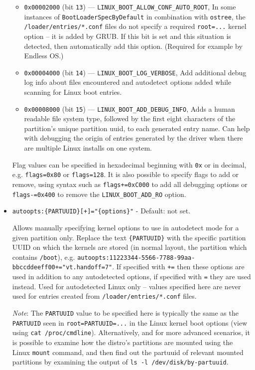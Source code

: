 \documentclass[]{article}
\begin{document}
\begin{itemize}
\begin{itemize}
	  \item \texttt{0x00002000} (bit \texttt{13}) --- \texttt{LINUX\_BOOT\_ALLOW\_CONF\_AUTO\_ROOT},
	  In some instances of \texttt{BootLoaderSpecByDefault} in combination with \texttt{ostree}, the
    \texttt{/loader/entries/*.conf} files do not specify a required \texttt{root=...} kernel
    option -- it is added by GRUB. If this bit is set and this situation is detected, then
    automatically add this option. (Required for example by Endless OS.)
	  \item \texttt{0x00004000} (bit \texttt{14}) --- \texttt{LINUX\_BOOT\_LOG\_VERBOSE},
	  Add additional debug log info about files encountered and autodetect options added while scanning for
    Linux boot entries.
	  \item \texttt{0x00008000} (bit \texttt{15}) --- \texttt{LINUX\_BOOT\_ADD\_DEBUG\_INFO},
	  Adds a human readable file system type, followed by the first eight characters of the
	  partition's unique partition uuid, to each generated entry name. Can help with debugging
	  the origin of entries generated by the driver when there are multiple Linux installs on
	  one system.
  \end{itemize} \medskip

	Flag values can be specified in hexadecimal beginning with \texttt{0x} or in decimal,
  e.g. \texttt{flags=0x80} or \texttt{flags=128}. It is also possible to specify flags to
  add or remove, using syntax such as \texttt{flags+=0xC000} to add all debugging
  options or \texttt{flags-=0x400} to remove the \texttt{LINUX\_BOOT\_ADD\_RO} option. \medskip

	\item \texttt{autoopts:\{PARTUUID\}[+]="\{options\}"} - Default: not set. \medskip

  Allows manually specifying kernel options to use in autodetect mode for a given partition only.
  Replace the text \texttt{\{PARTUUID\}} with the specific partition UUID on which the kernels are stored
  (in normal layout, the partition which contains \texttt{/boot}),
  e.g. \texttt{autoopts:11223344-5566-7788-99aa-bbccddeeff00+="vt.handoff=7"}.
  If specified with \texttt{+=} then these options are used in addition to any autodetected options, if specified
  with \texttt{=} they are used instead. Used for autodetected Linux only -- values specified here are never
  used for entries created from \texttt{/loader/entries/*.conf} files.
  \medskip

  \emph{Note}: The \texttt{PARTUUID} value to be specified here is typically the same as the \texttt{PARTUUID}
  seen in \texttt{root=PARTUUID=...} in the Linux kernel boot options (view using
  \texttt{cat /proc/cmdline}). Alternatively, and
  for more advanced scenarios, it is possible to examine how the distro's partitions are mounted using the
  Linux \texttt{mount} command, and then find out the partuuid of relevant mounted partitions by examining the
  output of \texttt{ls -l /dev/disk/by-partuuid}. \medskip


\end{itemize}
\end{document}
